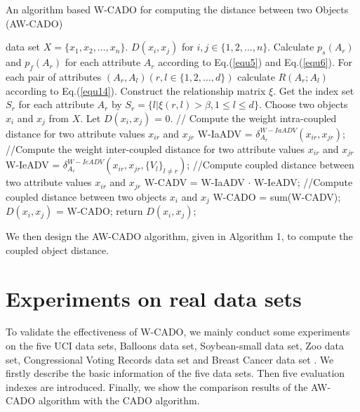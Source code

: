 \documentclass[review]{elsarticle}
\begin{document}
\begin{algorithm}[!ht]
  \caption{An algorithm based W-CADO for computing the distance between two Objects (AW-CADO)}
  \label{alg:Weight-CADO}
  \begin{algorithmic}[1]
    data set ${X = \{x_1,x_2,\dots,x_n\}}$.
    ${D(x_i,x_j)}$ for ${i,j \in \{1,2,\dots,n\}}$.
   \STATE Calculate ${p_s(A_r)}$ and ${p_f(A_r)}$ for each attribute ${A_r}$ according to Eq.(\ref{equ5}) and Eq.(\ref{equ6}).
   \STATE For each pair of attributes ${(A_r,A_l)(r,l \in \{1,2,\dots,d\})}$ calculate ${R(A_r;A_l)}$ according to Eq.(\ref{equ14}).
   \STATE Construct the relationship matrix ${\xi}$.
   \STATE Get the index set ${S_r}$ for each attribute ${A_r}$ by ${S_r = \{l|\xi(r,l) > \beta, 1 \leq l \leq d\}}$.
   \STATE Choose two objects ${x_i}$ and ${x_j}$ from ${X}$.
   \STATE Let ${D(x_i,x_j)}$ = 0.
   \STATE // Compute the weight intra-coupled distance for two attribute values $x_{ir}$ and $x_{jr}$
   \STATE W-IaADV = $\delta_{A_r}^{W-IaADV}(x_{ir},x_{jr})$;
   \STATE //Compute the weight inter-coupled distance for two attribute values $x_{ir}$ and $x_{jr}$
   \STATE W-IeADV = $\delta_{A_r}^{W-IeADV}(x_{ir},x_{jr},\{V_l\}_{l \neq r})$;
   \STATE //Compute coupled distance between two attribute values $x_{ir}$ and $x_{jr}$
   \STATE W-CADV = W-IaADV $\cdot$ W-IeADV;
   \STATE //Compute coupled distance between two objects $x_{i}$ and $x_{j}$
   \STATE W-CADO = sum(W-CADV);
   \ENDFOR
   \STATE ${D(x_i,x_j)}$ = W-CADO;
   \STATE return ${D(x_i,x_j)}$;
\end{algorithmic}
\end{algorithm}
We then design the AW-CADO algorithm, given in Algorithm 1, to compute the coupled object distance.

\section{Experiments on real data sets}
To validate the effectiveness of W-CADO, we mainly conduct some experiments on the five UCI data sets, Balloons data set, Soybean-small data set, Zoo data set, Congressional Voting Records data set and Breast Cancer data set \cite{bache2014uci}. We firstly describe the basic information of the five data sets. Then five evaluation indexes are introduced. Finally, we show the comparison results of the AW-CADO algorithm with the CADO algorithm.
\end{document}
